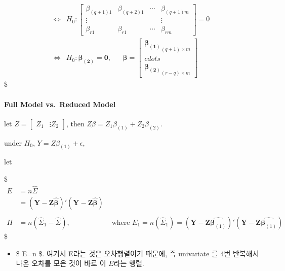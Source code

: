\documentclass[
]{book}
\providecommand{\tightlist}{%
  \setlength{\itemsep}{0pt}\setlength{\parskip}{0pt}}
\begin{document}
{{\begin{align*}
\iff

&H_0: \begin{bmatrix} \beta_{(q+1)1} & \beta_{(q+2)1} & \cdots & \beta_{(q+1)m} \\ \vdots &&& \vdots \\ \beta_{r1} & \beta_{r1} & \cdots & \beta_{rm} \end{bmatrix} = 0 \\

\iff

&H_0: \pmb{\beta_{(2)}} = \pmb 0, \; \; \; \; \; \ \pmb \beta = \begin{bmatrix} \pmb{\beta_{(1)}}_{(q+1) \times m} \\ cdots \\ \pmb{\beta_{(2)}}_{(r-q) \times m} \end{bmatrix}


\end{align*}
\$

\hypertarget{full-model-vs.-reduced-model}{%
\paragraph{Full Model vs.~Reduced Model}\label{full-model-vs.-reduced-model}}

let \(Z = \begin{bmatrix} Z_1 & \vdots Z_2 \end{bmatrix}\), then \(Z \beta = Z_1 \beta_{(1)} + Z_2 \beta_{(2)}\).

under \(H_0\), \(Y = Z \beta_{(1)} + \epsilon\),

let

\$
\begin{align*}

E &= n \hat \Sigma &\\
&= (\pmb Y - \pmb Z \hat{\pmb \beta})'(\pmb Y - \pmb Z \hat{\pmb \beta})& \tag{Full Model}\\
\\  
H &= n(\hat \Sigma_1 - \hat \Sigma), &\text{ where } E_1 = n(\hat \Sigma_1) = (\pmb Y - \pmb Z \hat{\pmb \beta_{(1)}})'(\pmb Y - \pmb Z \hat{\pmb \beta_{(1)}}) \tag{under H0}

\end{align*}
\$

\begin{itemize}
\tightlist
\item
  \$ E=n \hat \Sigma \$. 여기서 E라는 것은 오차행렬이기 때문에, 즉 univariate 를 4번 반복해서 나온 오차를 모은 것이 바로 이 \(E\)라는 행렬.
\end{itemize}

}}
\end{document}
